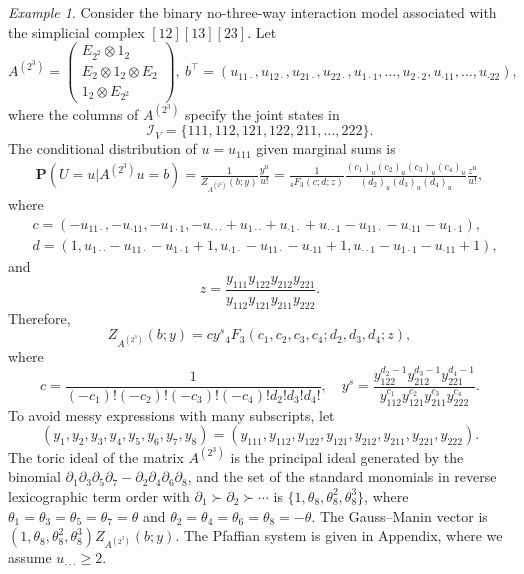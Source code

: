 \documentclass[a4paper,12pt]{article}
\theoremstyle{plain}
\theoremstyle{remark}
\newtheorem{example}[theorem]{Example}
\begin{document}
\begin{example}\label{exam:3way}  
  Consider the binary no-three-way interaction model associated
  with the simplicial complex $[12][13][23]$. Let
  \[
    A^{(2^3)}=
    \left(
    \begin{array}{c}
    E_{2^2} \otimes 1_2\\
    E_2 \otimes 1_2 \otimes E_2\\ 
    1_2 \otimes E_{2^2}
    \end{array}
    \right), ~
    b^\top=(
    u_{11\cdot},u_{12\cdot},u_{21\cdot},u_{22\cdot},
    u_{1\cdot1},\ldots,u_{2\cdot2},u_{\cdot11},\ldots,u_{\cdot22}),
  \]
  where the columns of $A^{(2^3)}$ specify the joint states in
  \[
  \mathcal{I}_V=\{111,112,121,122,211,\ldots,222\}.
  \]
  The conditional distribution of $u=u_{111}$ given marginal sums is
  \begin{align*}
    \mathbf{P}(U=u|A^{(2^3)} u=b)
    =\frac{1}{Z_{A^{(2^3)}}(b;y)}\frac{y^u}{u!}
    =\frac{1}{{}_4F_3(c;d;z)}
    \frac{(c_1)_u(c_2)_u(c_3)_u(c_4)_u}
    {(d_2)_u(d_3)_u(d_4)_u}\frac{z^u}{u!},
  \end{align*}
  where
  \begin{align*}
  &c=(-u_{11\cdot},-u_{\cdot11},-u_{1\cdot1},
      -u_{\cdot\cdot\cdot}+u_{1\cdot\cdot}+u_{\cdot1\cdot}
      +u_{\cdot\cdot1}-u_{11\cdot}-u_{\cdot11}-u_{1\cdot1}),\\
  &d=(1,u_{1\cdot\cdot}-u_{11\cdot}-u_{1\cdot1}+1,
      u_{\cdot1\cdot}-u_{11\cdot}-u_{\cdot11}+1,
      u_{\cdot\cdot1}-u_{1\cdot1}-u_{\cdot11}+1),
  \end{align*}
  and
  \[
  z=\frac{y_{111}y_{122}y_{212}y_{221}}{y_{112}y_{121}y_{211}y_{222}}.
  \]
  Therefore,
  \[
    Z_{A^{(2^3)}}(b;y)=cy^s{}_4F_3(c_1,c_2,c_3,c_4;d_2,d_3,d_4;z),
  \]
  where  
  \[
  c=\frac{1}{(-c_1)!(-c_2)!(-c_3)!(-c_4)!d_2!d_3!d_4!}, \quad
  y^s=\frac{y_{122}^{d_2-1}y_{212}^{d_3-1}y_{221}^{d_4-1}}
    {y_{112}^{c_1}y_{121}^{c_2}y_{211}^{c_3}y_{222}^{c_4}}.
  \]
  To avoid messy expressions with many subscripts, let
  \[
  (y_1,y_2,y_3,y_4,y_5,y_6,y_7,y_8)=
  (y_{111},y_{112},y_{122},y_{121},y_{212},y_{211},y_{221},y_{222}).
  \]
  The toric ideal of the matrix $A^{(2^3)}$ is the principal ideal
  generated by the binomial 
  $\partial_1\partial_3\partial_5\partial_7-\partial_2\partial_4\partial_6\partial_8$,
  and the set of the standard monomials in reverse lexicographic
  term order with $\partial_1\succ\partial_2\succ\cdots$ is
  $\{1,\theta_8,\theta_8^2,\theta_8^3\}$, where
  $\theta_1=\theta_3=\theta_5=\theta_7=\theta$ and
  $\theta_2=\theta_4=\theta_6=\theta_8=-\theta$.
  The Gauss--Manin vector is
  $(1,\theta_8,\theta^2_8,\theta^3_8)Z_{A^{(2^3)}}(b;y)$.
  The Pfaffian system is given in Appendix, where we assume $u_{\cdot\cdot\cdot}\ge 2$.
\end{example}
\end{document}
